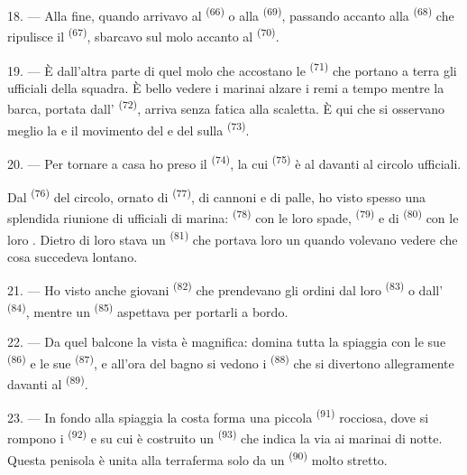 18. --- Alla fine, quando arrivavo al  \textsuperscript{(66)} o
alla  \textsuperscript{(69)}, passando accanto alla 
\textsuperscript{(68)} che ripulisce il  \textsuperscript{(67)},
sbarcavo sul molo accanto al  \textsuperscript{(70)}.

19. --- È dall'altra parte di quel molo che accostano le 
\textsuperscript{(71)} che portano a terra gli ufficiali della squadra. È bello vedere
i marinai alzare i remi a tempo mentre la barca, portata dall'
\textsuperscript{(72)}, arriva senza fatica alla scaletta. È qui che si osservano
meglio la  e il movimento del  e del 
sulla  \textsuperscript{(73)}.

\VUsaut{3.0mm}
\VUsaut{3.0mm}

20. --- Per tornare a casa ho preso il  \textsuperscript{(74)},
la cui  \textsuperscript{(75)} è al  davanti al circolo
ufficiali.

Dal  \textsuperscript{(76)} del circolo, ornato di 
\textsuperscript{(77)}, di cannoni e di palle, ho visto spesso una splendida riunione
di ufficiali di marina:  \textsuperscript{(78)} con le loro spade,
 \textsuperscript{(79)} e di 
\textsuperscript{(80)} con le loro . Dietro di loro stava un
 \textsuperscript{(81)} che portava loro un 
quando volevano vedere che cosa succedeva lontano.

21. --- Ho visto anche giovani  \textsuperscript{(82)} che
prendevano gli ordini dal loro  \textsuperscript{(83)} o
dall' \textsuperscript{(84)}, mentre un 
\textsuperscript{(85)} aspettava per portarli a bordo.

22. --- Da quel balcone la vista è magnifica: domina tutta la spiaggia con le sue
 \textsuperscript{(86)} e le sue 
\textsuperscript{(87)}, e all'ora del bagno si vedono i 
\textsuperscript{(88)} che si divertono allegramente davanti al 
\textsuperscript{(89)}.

23. --- In fondo alla spiaggia la costa forma una piccola 
\textsuperscript{(91)} rocciosa, dove si rompono i 
\textsuperscript{(92)} e su cui è costruito un  \textsuperscript{(93)} che
indica la via ai marinai di notte. Questa penisola è unita alla terraferma solo da un
 \textsuperscript{(90)} molto stretto.


